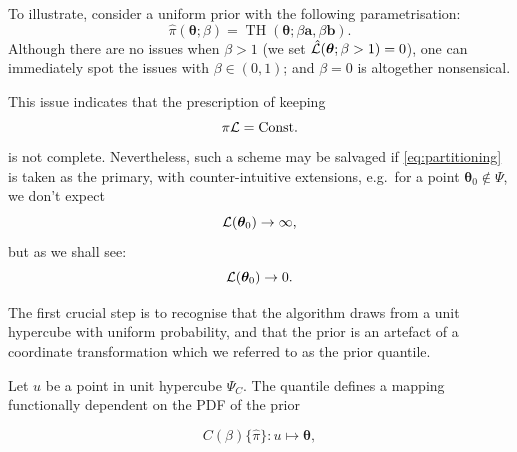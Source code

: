 \documentclass[usenatbib]{mnras}
\DeclareMathOperator{\TopHat}{TH}
\begin{document}
To illustrate, consider a uniform prior with the following
parametrisation:
\begin{equation}
  \hat{\pi}(\bm{\theta}; \beta) = \TopHat(\bm{\theta}; \beta \bm{a}, \beta \bm{b}).
\end{equation}
Although there are no issues when \(\beta>1\) (we set
\({\cal\hat{L}}(\bm{\theta}; \beta>1)=0\)), one can immediately
spot the issues with \(\beta \in (0,1)\); and \(\beta=0\) is
altogether nonsensical.

This issue indicates that the prescription of keeping
\begin{equation}
  \pi {\cal L} = \text{Const.}
\end{equation}
is not complete. Nevertheless, such a scheme may be salvaged if
\cref{eq:partitioning} is taken as the primary, with counter-intuitive
extensions, e.g.~for a point \(\bm{\theta}_{0} \notin \Psi\), we don't
expect
\begin{equation}
{\cal L}(\bm{\theta}_{0}) \rightarrow \infty,
\end{equation}
but as we shall see:
  \begin{equation}
    {\cal L}(\bm{\theta}_{0}) \rightarrow 0.
  \end{equation}
  
  The first crucial step is to recognise that the algorithm draws from
  a unit hypercube with uniform probability, and that the prior is an
  artefact of a coordinate transformation which we referred to as the
  prior quantile.

Let \(u\) be a point in unit hypercube \(\Psi_{C}\). The quantile
defines a mapping functionally dependent on the PDF of the prior

\begin{equation}
  C(\beta)\lbrace \hat{\pi}\rbrace:u \mapsto \bm{\theta},\label{eq:coordinate-transform}
\end{equation}
\end{document}
